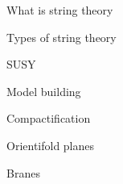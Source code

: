 
What is string theory


Types of string theory


SUSY


Model building


Compactification


Orientifold planes


Branes

